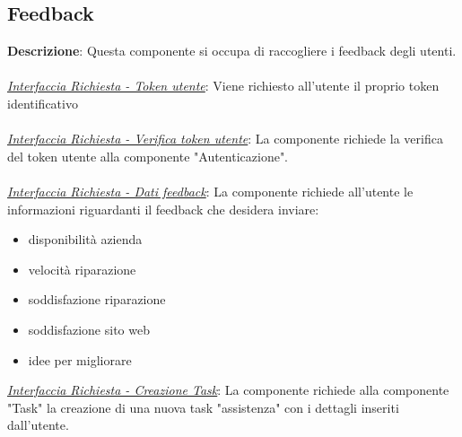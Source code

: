 \documentclass{report}
\begin{document}
\subsection*{Feedback}
\textbf{Descrizione}: Questa componente si occupa di raccogliere i feedback degli utenti.\\ \\
\uline{\textit{Interfaccia Richiesta - Token utente}}: 
Viene richiesto all'utente il proprio token identificativo\\ \\
\uline{\textit{Interfaccia Richiesta - Verifica token utente}}:
La componente richiede la verifica del token utente alla componente "Autenticazione".\\ \\
\uline{\textit{Interfaccia Richiesta - Dati feedback}}:
La componente richiede all'utente le informazioni riguardanti il feedback che desidera inviare:
\begin{itemize}
	\item disponibilità azienda
	\item velocità riparazione
	\item soddisfazione riparazione
	\item soddisfazione sito web
	\item idee per migliorare
\end{itemize}
\uline{\textit{Interfaccia Richiesta - Creazione Task}}:
La componente richiede alla componente "Task" la creazione di una nuova task "assistenza" con i dettagli inseriti dall'utente.
\end{document}
